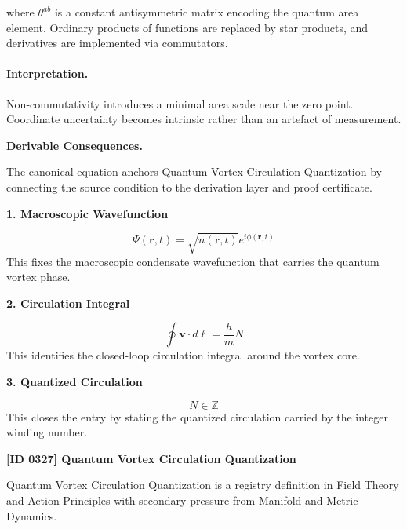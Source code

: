 where $\theta^{ab}$ is a constant antisymmetric matrix encoding the quantum area element.  Ordinary products of functions are replaced by star products, and derivatives are implemented via commutators.

\paragraph{Interpretation.}

Non‑commutativity introduces a minimal area scale near the zero point.  Coordinate uncertainty becomes intrinsic rather than an artefact of measurement.

\par\vspace{0.35em}
\noindent\textbf{Derivable Consequences.}\quad
\begingroup
\footnotesize
\raggedright
The canonical equation anchors Quantum Vortex Circulation Quantization by connecting the source condition to the derivation layer and proof certificate.
\par\endgroup

\noindent\textbf{1. Macroscopic Wavefunction}\par
\[
\Psi(\mathbf{r},t)=\sqrt{n(\mathbf{r},t)}e^{i\phi(\mathbf{r},t)}
\]
\noindent This fixes the macroscopic condensate wavefunction that carries the quantum vortex phase.\par
\noindent\textbf{2. Circulation Integral}\par
\[
\oint \mathbf{v}\cdot d\boldsymbol{\ell}=\frac{h}{m}N
\]
\noindent This identifies the closed-loop circulation integral around the vortex core.\par
\noindent\textbf{3. Quantized Circulation}\par
\[
N\in\mathbb{Z}
\]
\noindent This closes the entry by stating the quantized circulation carried by the integer winding number.\par

\clearpage
\noindent\textbf{[ID 0327] Quantum Vortex Circulation Quantization}\par
\vspace{0.35em}
\begingroup\small
{}
Quantum Vortex Circulation Quantization is a registry definition in Field Theory and Action Principles with secondary pressure from Manifold and Metric Dynamics.

